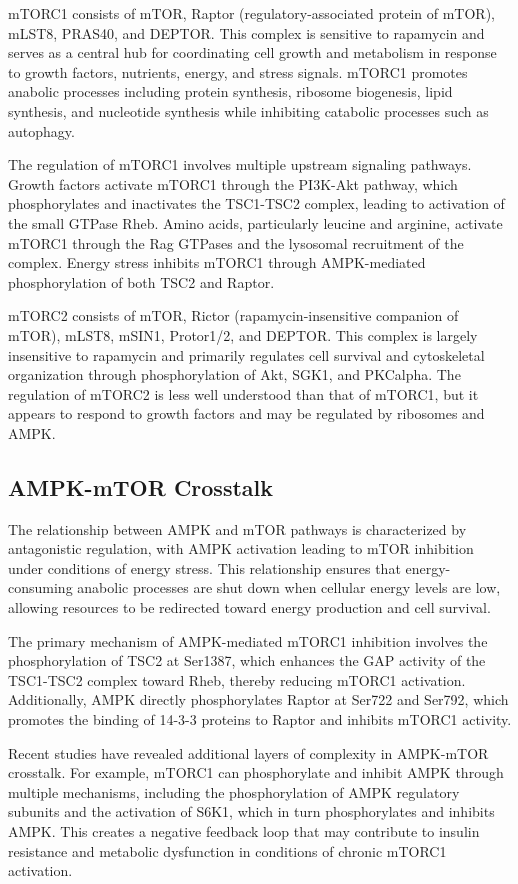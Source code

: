 \documentclass[11pt,a4paper]{article}
\begin{document}
mTORC1 consists of mTOR, Raptor (regulatory-associated protein of mTOR), mLST8, PRAS40, and DEPTOR. This complex is sensitive to rapamycin and serves as a central hub for coordinating cell growth and metabolism in response to growth factors, nutrients, energy, and stress signals. mTORC1 promotes anabolic processes including protein synthesis, ribosome biogenesis, lipid synthesis, and nucleotide synthesis while inhibiting catabolic processes such as autophagy.

The regulation of mTORC1 involves multiple upstream signaling pathways. Growth factors activate mTORC1 through the PI3K-Akt pathway, which phosphorylates and inactivates the TSC1-TSC2 complex, leading to activation of the small GTPase Rheb. Amino acids, particularly leucine and arginine, activate mTORC1 through the Rag GTPases and the lysosomal recruitment of the complex. Energy stress inhibits mTORC1 through AMPK-mediated phosphorylation of both TSC2 and Raptor.

mTORC2 consists of mTOR, Rictor (rapamycin-insensitive companion of mTOR), mLST8, mSIN1, Protor1/2, and DEPTOR. This complex is largely insensitive to rapamycin and primarily regulates cell survival and cytoskeletal organization through phosphorylation of Akt, SGK1, and PKCalpha. The regulation of mTORC2 is less well understood than that of mTORC1, but it appears to respond to growth factors and may be regulated by ribosomes and AMPK.

\subsection{AMPK-mTOR Crosstalk}

The relationship between AMPK and mTOR pathways is characterized by antagonistic regulation, with AMPK activation leading to mTOR inhibition under conditions of energy stress. This relationship ensures that energy-consuming anabolic processes are shut down when cellular energy levels are low, allowing resources to be redirected toward energy production and cell survival.

The primary mechanism of AMPK-mediated mTORC1 inhibition involves the phosphorylation of TSC2 at Ser1387, which enhances the GAP activity of the TSC1-TSC2 complex toward Rheb, thereby reducing mTORC1 activation. Additionally, AMPK directly phosphorylates Raptor at Ser722 and Ser792, which promotes the binding of 14-3-3 proteins to Raptor and inhibits mTORC1 activity.

Recent studies have revealed additional layers of complexity in AMPK-mTOR crosstalk. For example, mTORC1 can phosphorylate and inhibit AMPK through multiple mechanisms, including the phosphorylation of AMPK regulatory subunits and the activation of S6K1, which in turn phosphorylates and inhibits AMPK. This creates a negative feedback loop that may contribute to insulin resistance and metabolic dysfunction in conditions of chronic mTORC1 activation.
\end{document}
